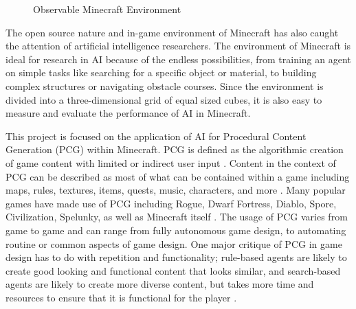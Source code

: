 \documentclass[11pt, oneside]{article}
\begin{document}
\begin{normalsize}
\begin{figure}[H]%
    \centering
    \qquad
    \caption{Observable Minecraft Environment}%
    \label{fig:env}%
\end{figure}

The open source nature and in-game environment of Minecraft has also caught the attention of artificial intelligence researchers. The environment of Minecraft is ideal for research in AI because of the endless possibilities, from training an agent on simple tasks like searching for a specific object or material, to building complex structures or navigating obstacle courses. Since the environment is divided into a three-dimensional grid of equal sized cubes, it is also easy to measure and evaluate the performance of AI in Minecraft.

This project is focused on the application of AI for Procedural Content Generation (PCG) within Minecraft. PCG is defined as the algorithmic creation of game content with limited or indirect user input \cite{shaker2016procedural}. Content in the context of PCG can be described as most of what can be contained within a game including maps, rules, textures, items, quests, music, characters, and more \cite{shaker2016procedural}. Many popular games have made use of PCG including Rogue, Dwarf Fortress, Diablo, Spore, Civilization, Spelunky, as well as Minecraft itself \cite{shaker2016procedural}. The usage of PCG varies from game to game and can range from fully autonomous game design, to  automating routine or common aspects of game design. One major critique of PCG in game design has to do with repetition and functionality; rule-based agents are likely to create good looking and functional content that looks similar, and search-based agents are likely to create more diverse content, but takes more time and resources to ensure that it is functional for the player \cite{green_organic_2019}.


\end{normalsize}
\end{document}
